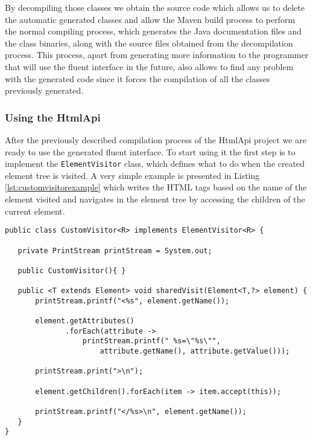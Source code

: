 \noindent
By decompiling those classes we obtain the source code which allows us to delete the automatic generated classes and allow the Maven build process to perform the normal compiling process, which generates the Java documentation files and the class binaries, along with the source files obtained from the decompilation process. This process, apart from generating more information to the programmer that will use the fluent interface in the future, also allows to find any problem with the generated code since it forces the compilation of all the classes previously generated.

\subsubsection{Using the HtmlApi}

After the previously described compilation process of the HtmlApi project we are ready to use the generated fluent interface. To start using it the first step is to implement the \texttt{ElementVisitor} class, which defines what to do when the created element tree is visited. A very simple example is presented in Listing \ref{lst:customvisitorexample} which writes the \ac{HTML} tags based on the name of the element visited and navigates in the element tree by accessing the children of the current element.

\bigskip


\begin{minipage}{\linewidth}
\begin{lstlisting}[caption={Custom Visitor},label={lst:customvisitorexample}]
public class CustomVisitor<R> implements ElementVisitor<R> {

   private PrintStream printStream = System.out;

   public CustomVisitor(){ }

   public <T extends Element> void sharedVisit(Element<T,?> element) {
       printStream.printf("<%s", element.getName());

       element.getAttributes()
              .forEach(attribute -> 
                  printStream.printf(" %s=\"%s\"", 
                      attribute.getName(), attribute.getValue()));

       printStream.print(">\n");

       element.getChildren().forEach(item -> item.accept(this));

       printStream.printf("</%s>\n", element.getName());
   }
}
\end{lstlisting}
\end{minipage}

